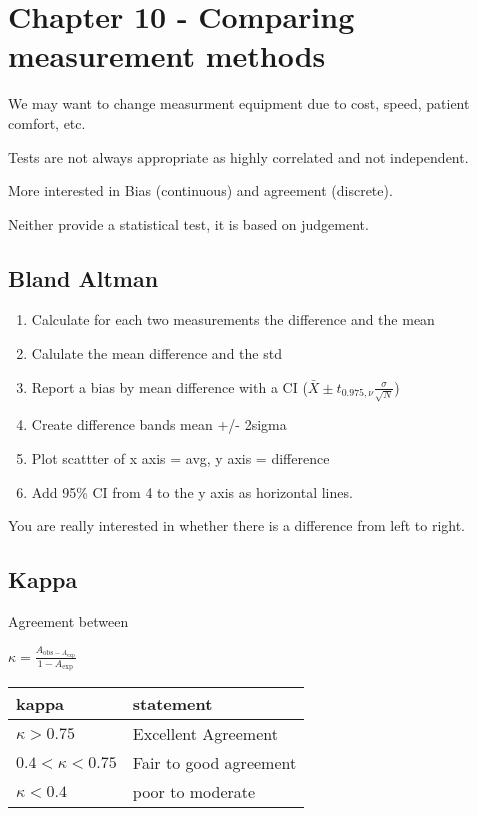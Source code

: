 \documentclass[
  letterpaper,
  DIV=11,
  numbers=noendperiod]{scrreprt}
\providecommand{\tightlist}{%
  \setlength{\itemsep}{0pt}\setlength{\parskip}{0pt}}\usepackage{longtable,booktabs,array}
\begin{document}
\hypertarget{chapter-10---comparing-measurement-methods}{%
\section{Chapter 10 - Comparing measurement
methods}\label{chapter-10---comparing-measurement-methods}}

We may want to change measurment equipment due to cost, speed, patient
comfort, etc.

Tests are not always appropriate as highly correlated and not
independent.

More interested in Bias (continuous) and agreement (discrete).

Neither provide a statistical test, it is based on judgement.

\hypertarget{bland-altman}{%
\subsection{Bland Altman}\label{bland-altman}}

\begin{enumerate}
\def\labelenumi{\arabic{enumi})}
\tightlist
\item
  Calculate for each two measurements the difference and the mean
\item
  Calulate the mean difference and the std
\item
  Report a bias by mean difference with a CI
  (\(\bar{X} \pm t_{0.975, \nu} \frac{\sigma}{\sqrt{N}}\))
\item
  Create difference bands mean +/- 2sigma
\item
  Plot scattter of x axis = avg, y axis = difference
\item
  Add 95\% CI from 4 to the y axis as horizontal lines.
\end{enumerate}

You are really interested in whether there is a difference from left to
right.

\hypertarget{kappa}{%
\subsection{Kappa}\label{kappa}}

Agreement between

\(\kappa =\frac{A_{\text{obs} - A_{\text{exp}}}}{1 - A_{\text{exp}}}\)

\begin{longtable}[]{@{}ll@{}}
\toprule()
kappa & statement \\
\midrule()
\endhead
\(\kappa >0.75\) & Excellent Agreement \\
\(0.4<\kappa <0.75\) & Fair to good agreement \\
\(\kappa <0.4\) & poor to moderate \\
\bottomrule()
\end{longtable}
\end{document}
